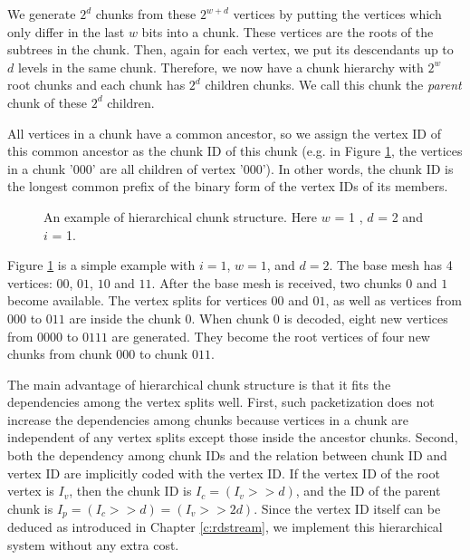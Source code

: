     We generate $2^d$ chunks from these $2^{w+d}$ vertices 
    by putting the vertices which only differ in the last $w$ bits
    into a chunk. These vertices are the roots of the subtrees in the chunk.
    Then, again for each vertex, we put its descendants up to $d$
    levels
    in the same chunk.  Therefore, we now have a chunk hierarchy with $2^{w}$
    root chunks and each chunk has $2^{d}$ children chunks.
    We call this chunk the 
    \textit{parent} chunk of these $2^{d}$ children.
    
    All vertices in a chunk have a common ancestor, so we 
    assign the vertex ID of this common ancestor as the chunk
    ID of this chunk (e.g. in Figure \ref{f:packetize}, the vertices
    in a chunk '000' are all children of vertex '000').
    In other words, the chunk ID is the longest common prefix
    of the binary form of the vertex IDs of its members.

   \begin{figure}[t]
    \centering
    \caption{An example of hierarchical chunk structure. Here $w$ = 1 , $d$ = 2
    and $i$ = 1. 
    \label{f:packetize}}
    \end{figure}
    Figure \ref{f:packetize} is a simple example with 
    $i=1$, $w = 1$, and $d = 2$. The base mesh has 4 vertices: 
    $00$, $01$, $10$ and $11$. 
    After the base mesh is received, two chunks $0$ and $1$ become
    available. 
    The vertex splits for vertices $00$ and $01$, as well as vertices from $000$ to $011$ 
    are inside the chunk $0$. 
    When chunk $0$ is decoded, %
    eight new vertices from $0000$ to $0111$ are generated. 
    They become the root vertices of four new chunks from chunk $000$ to 
    chunk $011$.%
    
    The main advantage of hierarchical chunk structure %
    is that it fits the dependencies among the vertex splits
    well.
    First, such packetization does not increase the dependencies
    among chunks because 
    vertices in a chunk are independent of any vertex splits except
    those inside the ancestor chunks.
    Second, both the dependency among chunk IDs and the relation between
    chunk ID and vertex ID are implicitly 
    coded with the vertex ID.  
    If the vertex ID of the root vertex is $I_v$, 
    then the chunk ID is
    $I_c = (I_v >> d)$, 
    and the ID of the parent chunk is
    $I_p = (I_c >> d) = (I_v >> 2d).$
    Since the vertex ID itself can be deduced as introduced in
    Chapter \ref{c:rdstream}, we implement this hierarchical system without any extra cost.

